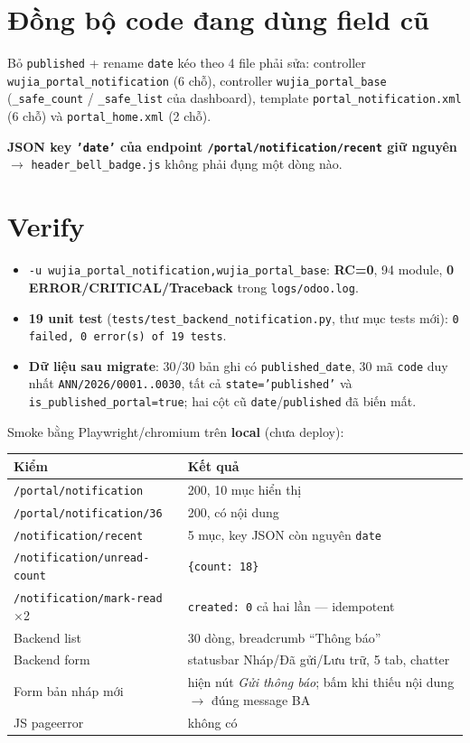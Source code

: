 \section{Đồng bộ code đang dùng field cũ}

Bỏ \texttt{published} + rename \texttt{date} kéo theo 4 file phải sửa:
controller \texttt{wujia\_portal\_notification} (6 chỗ), controller \texttt{wujia\_portal\_base}
(\texttt{\_safe\_count} / \texttt{\_safe\_list} của dashboard), template
\texttt{portal\_notification.xml} (6 chỗ) và \texttt{portal\_home.xml} (2 chỗ).

\textbf{JSON key \texttt{'date'} của endpoint \texttt{/portal/notification/recent} giữ nguyên} $\to$
\texttt{header\_bell\_badge.js} không phải đụng một dòng nào.

\section{Verify}

\begin{itemize}
  \item \texttt{-u wujia\_portal\_notification,wujia\_portal\_base}: \textbf{RC=0}, 94 module,
    \textbf{0 ERROR/CRITICAL/Traceback} trong \texttt{logs/odoo.log}.
  \item \textbf{19 unit test} (\texttt{tests/test\_backend\_notification.py}, thư mục tests mới):
    \texttt{0 failed, 0 error(s) of 19 tests}.
  \item \textbf{Dữ liệu sau migrate}: 30/30 bản ghi có \texttt{published\_date}, 30 mã
    \texttt{code} duy nhất \texttt{ANN/2026/0001..0030}, tất cả \texttt{state='published'} và
    \texttt{is\_published\_portal=true}; hai cột cũ \texttt{date}/\texttt{published} đã biến mất.
\end{itemize}

Smoke bằng Playwright/chromium trên \textbf{local} (chưa deploy):

\begin{center}
\begin{tabular}{ll}
\hline
\textbf{Kiểm} & \textbf{Kết quả} \\
\hline
\texttt{/portal/notification} & 200, 10 mục hiển thị \\
\texttt{/portal/notification/36} & 200, có nội dung \\
\texttt{/notification/recent} & 5 mục, key JSON còn nguyên \texttt{date} \\
\texttt{/notification/unread-count} & \texttt{\{count: 18\}} \\
\texttt{/notification/mark-read} $\times$2 & \texttt{created: 0} cả hai lần --- idempotent \\
Backend list & 30 dòng, breadcrumb ``Thông báo'' \\
Backend form & statusbar Nháp/Đã gửi/Lưu trữ, 5 tab, chatter \\
Form bản nháp mới & hiện nút \emph{Gửi thông báo}; bấm khi thiếu nội dung $\to$ đúng message BA \\
JS pageerror & không có \\
\hline
\end{tabular}
\end{center}

